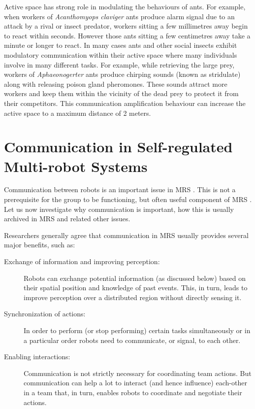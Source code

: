 Active space has strong role in modulating the behaviours of ants. For example, when workers of {\em Acanthomyops claviger} ants produce alarm signal due to an attack by a rival or insect predator, workers sitting a few millimetres away begin to react within seconds. However those ants sitting a few centimetres away take a minute or longer to react. In many cases ants and other social insects exhibit modulatory communication within their active space where many individuals involve in many different tasks. For example, while retrieving the large prey, workers of {\em Aphaeonogerter} ants produce chirping sounds (known as stridulate) along with releasing poison gland pheromones. These sounds attract more workers and keep them within the vicinity of the dead prey  to protect it from their competitors. This communication amplification behaviour can increase the active space to a maximum distance of 2 meters.
\section{Communication in Self-regulated Multi-robot Systems}
Communication between robots is an  important issue in MRS \cite{Arkin1998}. This is not a prerequisite for the group to be functioning, but often useful component of MRS \cite{Mataric2007}. Let us now investigate why communication is important, how this is usually archived in MRS and related other issues.

Researchers generally agree that communication in MRS usually provides several major benefits, such as:

\begin{description}
\item[Exchange of information and improving perception:]
Robots  can exchange potential information (as discussed below) based on their spatial position and knowledge of past events. This, in turn, leads to improve perception over a distributed region without directly sensing it.
\item[Synchronization of actions:]
In order to perform (or stop performing) certain tasks simultaneously or in a particular order robots need to communicate, or signal, to each other. 
\item[Enabling interactions:]
Communication is not strictly necessary for coordinating team actions. But  communication can help a lot to interact (and hence influence) each-other in a team that, in turn, enables robots to coordinate and negotiate their actions.
\end{description}


